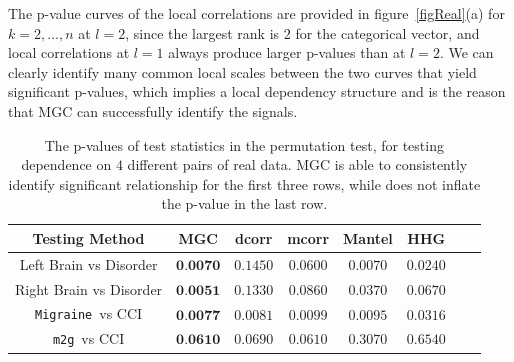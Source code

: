 \documentclass[11pt]{article}
\providecommand{\sct}[1]{{\sc \texttt{#1}}}
\newcommand{\Migraine}{\sct{Migraine}}
\newcommand{\mtg}{\sct{m2g}}
\begin{document}
The p-value curves of the local correlations are provided in figure~\ref{figReal}(a) for $k=2,\ldots,n$ at $l=2$, since the largest rank is $2$ for the categorical vector, and local correlations at $l=1$ always produce larger p-values than at $l=2$. We can clearly identify many common local scales between the two curves that yield significant p-values, which implies a local dependency structure and is the reason that MGC can successfully identify the signals. %

\begin{table}[!t]
\Large
\renewcommand{\arraystretch}{0.5}
\centering
{\begin{tabular}{|c||c|c|c|c|c|c|c|}
\hline
Testing Method & MGC & dcorr & mcorr & Mantel & HHG \\
\hline
Left Brain vs Disorder  & $\textbf{0.0070}$ & $0.1450$ & $0.0600$ & $0.0070$ & $0.0240$ \\
\hline
Right Brain vs Disorder & $\textbf{0.0051}$ & $0.1330$ & $0.0860$  & $0.0370$ & $0.0670$\\
\hline
\Migraine~vs CCI & $\textbf{0.0077}$ & $0.0081$ & $0.0099$  & $0.0095$ & $0.0316$\\
\hline
\mtg~vs CCI & $\textbf{0.0610}$ & $0.0690$ & $0.0610$  & $0.3070$ & $0.6540$\\
\hline
\end{tabular}
\caption{The p-values of test statistics in the permutation test, for testing dependence on $4$ different pairs of real data. MGC is able to consistently identify significant relationship for the first three rows, while does not inflate the p-value in the last row.}
\label{table1}
}
\end{table}
\end{document}
